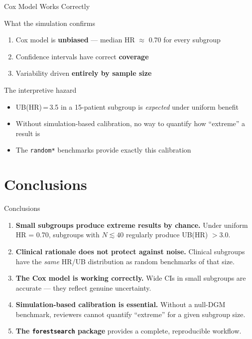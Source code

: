 \documentclass[
  11pt,
  ignorenonframetext,
  aspectratio=169,
]{beamer}
\begin{document}
\begin{frame}{Cox Model Works Correctly}
\label{cox-model-works-correctly}
\begin{block}{What the simulation confirms}
\begin{enumerate}
\item Cox model is \textbf{unbiased} --- median HR $\approx$ 0.70 for every subgroup
\item Confidence intervals have correct \textbf{coverage}
\item Variability driven \textbf{entirely by sample size}
\end{enumerate}
\end{block}

\begin{alertblock}{The interpretive hazard}
\begin{itemize}
\item UB(HR)\,=\,3.5 in a 15-patient subgroup is \emph{expected} under uniform benefit
\item Without simulation-based calibration, no way to quantify how ``extreme'' a result is
\item The \texttt{random*} benchmarks provide exactly this calibration
\end{itemize}
\end{alertblock}
\end{frame}

\section{Conclusions}\label{conclusions}

\begin{frame}[fragile]{Conclusions}
\label{conclusions-1}
\begin{enumerate}
\item
  \textbf{Small subgroups produce extreme results by chance.} Under
  uniform HR = 0.70, subgroups with \(N \lesssim 40\) regularly produce
  UB(HR) \(> 3.0\).
\item
  \textbf{Clinical rationale does not protect against noise.} Clinical
  subgroups have the \emph{same} HR/UB distribution as random benchmarks
  of that size.
\item
  \textbf{The Cox model is working correctly.} Wide CIs in small
  subgroups are accurate --- they reflect genuine uncertainty.
\item
  \textbf{Simulation-based calibration is essential.} Without a null-DGM
  benchmark, reviewers cannot quantify ``extreme'' for a given subgroup
  size.
\item
  \textbf{The \texttt{forestsearch} package} provides a complete,
  reproducible workflow.
\end{enumerate}
\end{frame}
\end{document}
